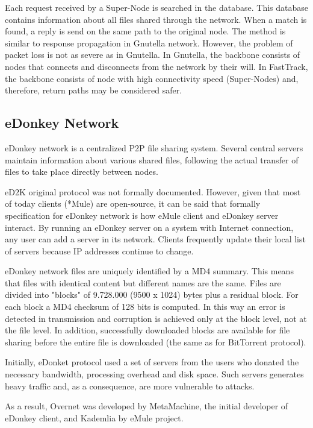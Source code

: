 Each request received by a Super-Node is searched in the database. This database
contains information about all files shared through the network. When a match is
found, a reply is send on the same path to the original node. The method is
similar to response propagation in Gnutella network. However, the problem of
packet loss is not as severe as in Gnutella. In Gnutella, the backbone consists
of nodes that connects and disconnects from the network by their will. In FastTrack,
the backbone consists of node with high connectivity speed  (Super-Nodes) and,
therefore, return paths may be considered safer.

\subsection{eDonkey Network}

eDonkey network is a centralized P2P file sharing system. Several central servers
maintain information about various shared files, following the actual transfer
of files to take place directly between nodes.

eD2K original protocol was not formally documented. However, given that most
of today clients (*Mule) are open-source, it can be said that formally
specification for eDonkey network is how eMule client and eDonkey server
interact. By running an eDonkey server on a system with Internet connection,
any user can add a server in its network. Clients frequently update their local
list of servers because IP addresses continue to change.

eDonkey network files are uniquely identified by a MD4 summary. This means that
files with identical content but different names are the same. Files are divided
into "blocks" of 9.728.000 (9500 x 1024) bytes plus a residual block. For each
block a MD4 checksum of 128 bits is computed. In this way an error is detected
in transmission and corruption is achieved only at the block level, not at the
file level. In addition, successfully downloaded blocks are available for file
sharing before the entire file is downloaded (the same as for BitTorrent
protocol).

Initially, eDonket protocol used a set of servers from the users who donated the
necessary bandwidth, processing overhead and disk space. Such servers generates
heavy traffic and, as a consequence, are more vulnerable to attacks.

As a result, Overnet was developed by MetaMachine, the initial developer of
eDonkey client, and Kademlia by eMule project.

